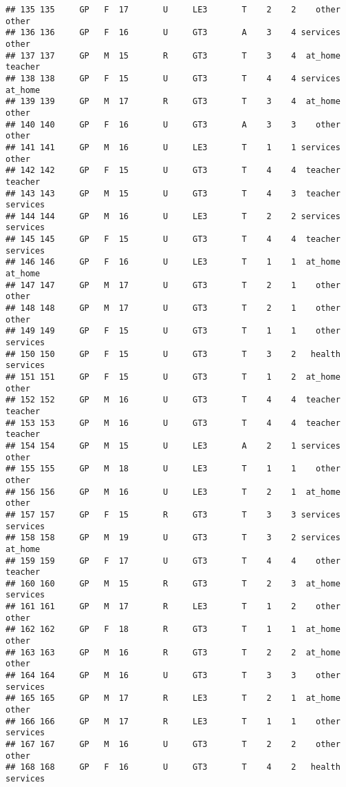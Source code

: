 \documentclass[]{article}
\begin{document}
\begin{verbatim}
## 135 135     GP   F  17       U     LE3       T    2    2    other    other
## 136 136     GP   F  16       U     GT3       A    3    4 services    other
## 137 137     GP   M  15       R     GT3       T    3    4  at_home  teacher
## 138 138     GP   F  15       U     GT3       T    4    4 services  at_home
## 139 139     GP   M  17       R     GT3       T    3    4  at_home    other
## 140 140     GP   F  16       U     GT3       A    3    3    other    other
## 141 141     GP   M  16       U     LE3       T    1    1 services    other
## 142 142     GP   F  15       U     GT3       T    4    4  teacher  teacher
## 143 143     GP   M  15       U     GT3       T    4    3  teacher services
## 144 144     GP   M  16       U     LE3       T    2    2 services services
## 145 145     GP   F  15       U     GT3       T    4    4  teacher services
## 146 146     GP   F  16       U     LE3       T    1    1  at_home  at_home
## 147 147     GP   M  17       U     GT3       T    2    1    other    other
## 148 148     GP   M  17       U     GT3       T    2    1    other    other
## 149 149     GP   F  15       U     GT3       T    1    1    other services
## 150 150     GP   F  15       U     GT3       T    3    2   health services
## 151 151     GP   F  15       U     GT3       T    1    2  at_home    other
## 152 152     GP   M  16       U     GT3       T    4    4  teacher  teacher
## 153 153     GP   M  16       U     GT3       T    4    4  teacher  teacher
## 154 154     GP   M  15       U     LE3       A    2    1 services    other
## 155 155     GP   M  18       U     LE3       T    1    1    other    other
## 156 156     GP   M  16       U     LE3       T    2    1  at_home    other
## 157 157     GP   F  15       R     GT3       T    3    3 services services
## 158 158     GP   M  19       U     GT3       T    3    2 services  at_home
## 159 159     GP   F  17       U     GT3       T    4    4    other  teacher
## 160 160     GP   M  15       R     GT3       T    2    3  at_home services
## 161 161     GP   M  17       R     LE3       T    1    2    other    other
## 162 162     GP   F  18       R     GT3       T    1    1  at_home    other
## 163 163     GP   M  16       R     GT3       T    2    2  at_home    other
## 164 164     GP   M  16       U     GT3       T    3    3    other services
## 165 165     GP   M  17       R     LE3       T    2    1  at_home    other
## 166 166     GP   M  17       R     LE3       T    1    1    other services
## 167 167     GP   M  16       U     GT3       T    2    2    other    other
## 168 168     GP   F  16       U     GT3       T    4    2   health services

\end{verbatim}
\end{document}
